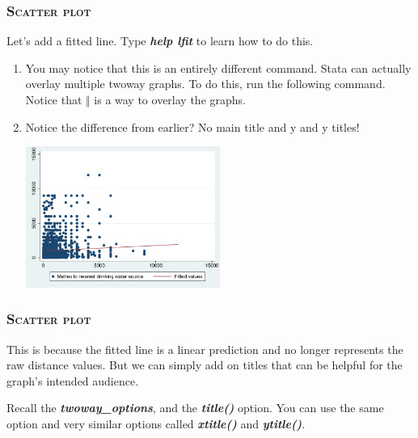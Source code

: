 \documentclass[10pt]{beamer}
\begin{document}
	\begin{frame}
	\frametitle{\textsc{Scatter plot}}	
		 Let's add a fitted line. Type \textbf{\textit{help lfit}} to learn how to do this.
		\begin{enumerate}
			  \item You may notice that this is an entirely different command. 
								Stata can actually overlay multiple twoway graphs. 
								To do this, run the following command.
								Notice that \textbf{$\Vert$} is a way to overlay the graphs.
		
\begin{stlog}\end{stlog}
			\vspace{1mm}
			 \item Notice the difference from earlier? No main title and y and y titles!
			\vspace{1mm}
		
\begin{center}
    \includegraphics[width=0.5\textwidth]{scatter_3.pdf}
\end{center}
		\end{enumerate}
	\end{frame}

	\begin{frame}
	\frametitle{\textsc{Scatter plot}}	
		 This is because the fitted line is a linear prediction and 
					 no longer represents the raw distance values. 
					 But we can simply add on titles that can be helpful for the graph's intended audience.
		
		 Recall the \textbf{\textit{twoway\_options}}, and the \textbf{\textit{title()}} option.
								You can use the same option and very similar options called \textbf{\textit{xtitle()}} and
								\textbf{\textit{ytitle()}}.
		
\begin{stlog}\end{stlog}
	\end{frame}
	
\end{document}
